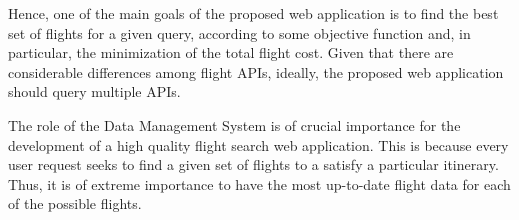 Hence, one of the main goals of the proposed web application is to find the best set of flights for a given query, according to some objective function and, in particular, the minimization of the total flight cost. Given that there are considerable differences among flight APIs, ideally, the proposed web application should query multiple APIs.

The role of the Data Management System is of crucial importance for the development of a high quality flight search web application. This is because every user request seeks to find a given set of flights to a satisfy a particular itinerary. Thus, it is of extreme importance to have the most up-to-date flight data for each of the possible flights.  

